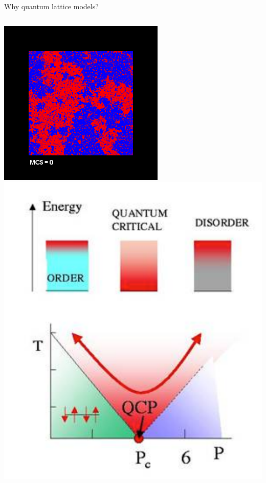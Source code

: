 \begin{frame}[t,fragile]{Why quantum lattice models?}
  \begin{columns}[T]
    \begin{column}{.2\textwidth}
      \includegraphics[width=\textwidth]{ising-tc.png} \\
      \includegraphics[width=\textwidth]{qcp.pdf}

\end{column}
\end{columns}
\end{frame}
